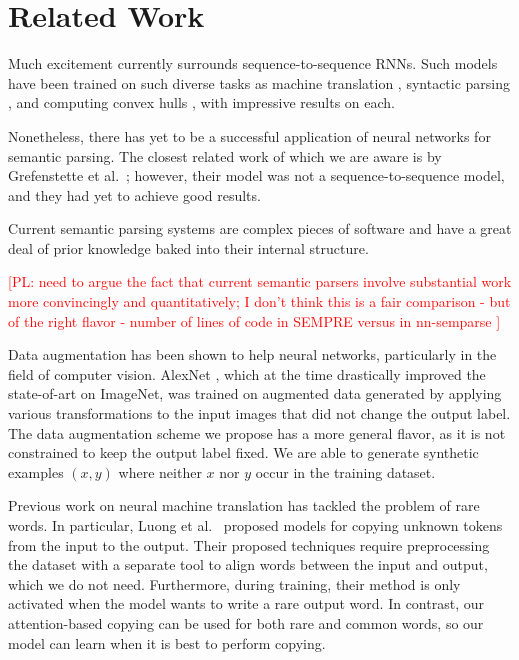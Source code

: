 \documentclass[11pt,letterpaper]{article}
\newcommand\pl[1]{\textcolor{red}{[PL: #1]}}
\begin{document}
\section{Related Work}
Much excitement currently surrounds sequence-to-sequence RNNs.
Such models have been trained on such diverse tasks as
machine translation \cite{sutskever2014sequence,bahdanau2014neural}, 
syntactic parsing \cite{vinyals2015grammar}, and 
computing convex hulls \cite{vinyals2015pointer}, 
with impressive results on each.

Nonetheless, there has yet to be a successful application of
neural networks for semantic parsing.
The closest related work of which we are aware is
by Grefenstette et al.~;
however, their model was not a sequence-to-sequence model,
and they had yet to achieve good results.

Current semantic parsing systems are complex pieces of software 
and have a great deal of prior knowledge baked into their internal structure.

\pl{need to argue the fact that current semantic parsers involve substantial
  work more convincingly and quantitatively;
  I don't think this is a fair comparison - but of the right flavor - number of lines
  of code in SEMPRE versus in nn-semparse
}

Data augmentation has been shown to help neural networks,
particularly in the field of computer vision.
AlexNet \cite{krizhevsky2012imagenet}, 
which at the time drastically improved
the state-of-art on ImageNet,
was trained on augmented data generated by applying various transformations
to the input images that did not change the output label.
The data augmentation scheme we propose has a more general flavor,
as it is not constrained to keep the output label fixed.
We are able to generate synthetic examples $(x, y)$
where neither $x$ nor $y$ occur in the training dataset.

Previous work on neural machine translation has
tackled the problem of rare words.
In particular, Luong et al.~
proposed models for copying unknown
tokens from the input to the output.
Their proposed techniques require preprocessing the dataset
with a separate tool to align words between the input and output,
which we do not need.
Furthermore, during training, their method is only activated when the model
wants to write a rare output word. 
In contrast, our attention-based copying can be used for 
both rare and common words,
so our model can learn when it is best to perform copying.
\end{document}
